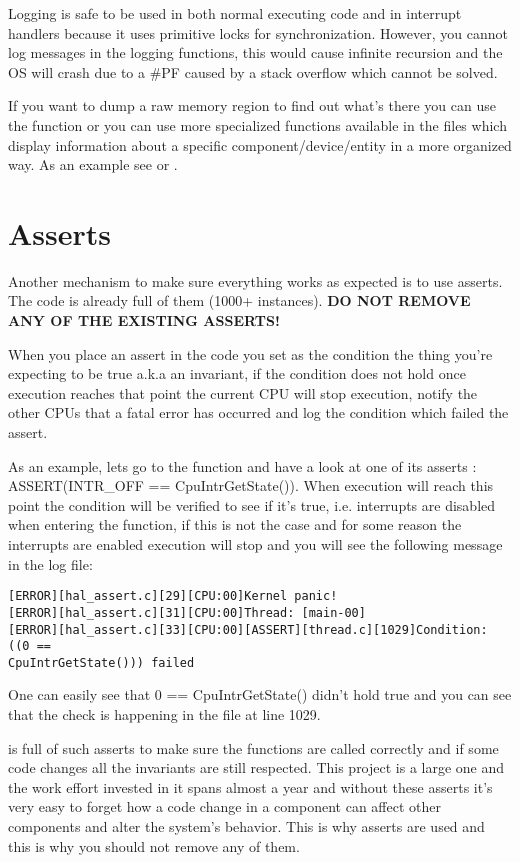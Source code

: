 \begin{appendices}
Logging is safe to be used in both normal executing code and in interrupt handlers because it uses
primitive locks for synchronization. However, you cannot log messages in the logging functions, this
would cause infinite recursion and the OS will crash due to a \#PF caused by a stack overflow which
cannot be solved.

If you want to dump a raw memory region to find out what's there you can use the 
function or you can use more specialized functions available in the  files which
display information about a specific component/device/entity in a more organized way. As an example
see  or .

\section{Asserts}

Another mechanism to make sure everything works as expected is to use asserts. The code is already
full of them (1000+ instances). \textbf{\color{red}DO NOT REMOVE ANY OF THE EXISTING ASSERTS!}

When you place an assert in the code you set as the condition the thing you're expecting to be true
a.k.a an invariant, if the condition does not hold once execution reaches that point the current CPU
 will stop execution, notify the other CPUs that a fatal error has occurred and log the condition
which failed the assert.

As an example, lets go to the  function and have a look at one of its asserts
: ASSERT(INTR\_OFF == CpuIntrGetState()). When execution will reach this point the condition will
be verified to see if it's true, i.e. interrupts are disabled when entering the function, if this is
not the case and for some reason the interrupts are enabled execution will stop and you will see the
following message in the log file:

\begin{verbatim}
[ERROR][hal_assert.c][29][CPU:00]Kernel panic!
[ERROR][hal_assert.c][31][CPU:00]Thread: [main-00]
[ERROR][hal_assert.c][33][CPU:00][ASSERT][thread.c][1029]Condition: ((0 == 
CpuIntrGetState())) failed
\end{verbatim}

One can easily see that 0 == CpuIntrGetState() didn't hold true and you can see that the check is
happening in the  file at line 1029.

\projectname is full of such asserts to make sure the functions are called correctly and if some
code changes all the invariants are still respected. This project is a large one and the work effort
invested in it spans almost a year and without these asserts it's very easy to forget how a code
change in a component can affect other components and alter the system's behavior. This is why
asserts are used and this is why you should not remove any of them.


\end{appendices}
